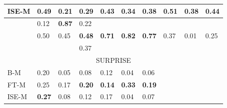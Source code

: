 \documentclass[11pt]{article}
\begin{document}
\begin{table}[!h]
\begin{tabular}{|l||l|l|l||l|l|l||l|l|l|}
\hline
    \tiny{ISE-M} & 
    \footnotesize{0.49} & 
    \footnotesize{0.21} & 
    \footnotesize{0.29} & 
    \footnotesize{0.43} & 
    \footnotesize{0.34} & 
    \footnotesize{0.38} & 
    \footnotesize{0.51} & 
    \footnotesize{0.38} & 
    \footnotesize{\textbf{0.44}} \\ 

\hline
    \tiny{\cite{strapparava2008learning} } &
    \footnotesize{0.12} & 
    \footnotesize{\textbf{0.87}} & 
    \footnotesize{0.22} &
    &
    &
    &
    &
    &
    \\

\hline
    \tiny{\cite{kim2010evaluation} } &
    \footnotesize{0.50} & 
    \footnotesize{0.45} & 
    \footnotesize{\textbf{0.48}} &
    \footnotesize{\textbf{0.71}} & 
    \footnotesize{\textbf{0.82}} & 
    \footnotesize{\textbf{0.77}} &
    \footnotesize{0.37} & 
    \footnotesize{0.01} & 
    \footnotesize{0.25} \\

\hline
    \tiny{\cite{danisman2008feeler}} &
    \footnotesize{} & 
    \footnotesize{} & 
    \footnotesize{0.37} &
    \footnotesize{} & 
    \footnotesize{} & 
    \footnotesize{} &
    \footnotesize{} & 
    \footnotesize{} & 
    \footnotesize{} \\

\hline
\hline
    \multicolumn{10}{|c|}{{SURPRISE}} \\                               
    
\hline
  \tiny{B-M} & 
  \footnotesize{0.20} & 
  \footnotesize{0.05} & 
  \footnotesize{0.08} & 
  \footnotesize{0.12} & 
  \footnotesize{0.04} & 
  \footnotesize{0.06} & 
  \footnotesize{} & 
  \footnotesize{} & 
  \footnotesize{} \\ 

\hline
    \tiny{FT-M} & 
    \footnotesize{0.25} & 
    \footnotesize{0.17} & 
    \footnotesize{\textbf{0.20}} & 
    \footnotesize{\textbf{0.14}} & 
    \footnotesize{\textbf{0.33}} & 
    \footnotesize{\textbf{0.19}} & 
    \footnotesize{} & 
    \footnotesize{} & 
    \footnotesize{} \\ 

\hline
    \tiny{ISE-M} & 
    \footnotesize{\textbf{0.27}} & 
    \footnotesize{0.08} & 
    \footnotesize{0.12} & 
    \footnotesize{0.17} & 
    \footnotesize{0.04} & 
    \footnotesize{0.07} & 
    \footnotesize{} & 
    \footnotesize{} & 
    \footnotesize{} \\ 



\end{tabular}
\end{table}
\end{document}
